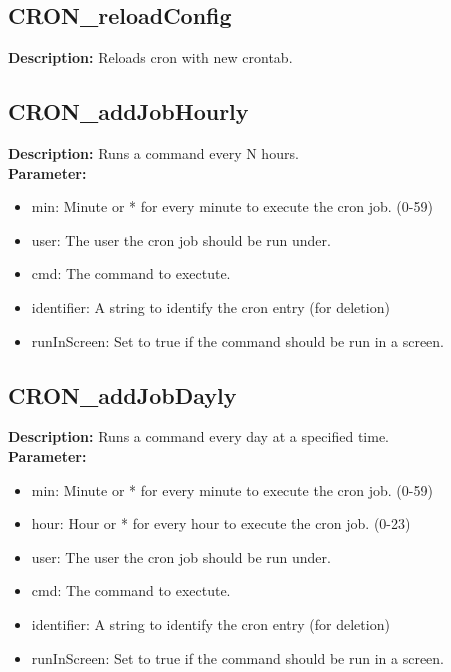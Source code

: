 \subsection{CRON\_reloadConfig}
\textbf{Description:} Reloads cron with new crontab.\\

\subsection{CRON\_addJobHourly}
\textbf{Description:} Runs a command every N hours.\\
\textbf{Parameter:}
\begin{itemize}
\item min: Minute or * for every minute to execute the cron job. (0-59)
\item user: The user the cron job should be run under.
\item cmd: The command to exectute.
\item identifier: A string to identify the cron entry (for deletion)
\item runInScreen: Set to true if the command should be run in a screen.
\end{itemize}

\subsection{CRON\_addJobDayly}
\textbf{Description:} Runs a command every day at a specified time.\\
\textbf{Parameter:}
\begin{itemize}
\item min: Minute or * for every minute to execute the cron job. (0-59)
\item hour: Hour or * for every hour to execute the cron job. (0-23)
\item user: The user the cron job should be run under.
\item cmd: The command to exectute.
\item identifier: A string to identify the cron entry (for deletion)
\item runInScreen: Set to true if the command should be run in a screen.
\end{itemize}

